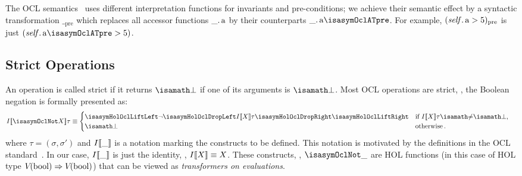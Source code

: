 The OCL semantics~\cite[Annex A]{omg:ocl:2003} uses different interpretation
functions for invariants and pre-conditions; we achieve their semantic effect by
a syntactic transformation $\__\text{pre}$ which replaces all accessor functions
$\getAttrib{\_}{a}$ by their counterparts
$\getAttrib{\_}{a\isasymOclATpre}$. For example, $(\getAttrib{\self}{a} >
5)_\text{pre}$ is just $(\getAttrib{\self}{a\isasymOclATpre} > 5)$.

\subsection{Strict Operations}%
\label{sec:strict-ops}%
An operation is called strict if it returns $\isasymbottom$ if one of its
arguments is $\isasymbottom$. Most {OCL} operations are strict, \eg, the
Boolean negation is formally presented as:
\begin{align*}
I\semantics{\isasymOclNot X}\tau & \equiv
  \begin{cases}
    \lift{\lnot \drop{I\semantics{X} \tau}}
    &\text{if $I\semantics{X}\tau\isasymnoteq\isasymbottom$}, \\
     \isasymbottom & \text{otherwise}\,.
   \end{cases}
\end{align*}
where $\tau = (\sigma, \sigma')$ and $I\llbracket \_ \rrbracket$ is a notation marking the
\holocl constructs to be defined. This notation is motivated by the definitions
in the {OCL} standard~\cite{omg:ocl:2003}. In our case, $I\llbracket \_ \rrbracket$ is
just the identity, \ie, $I\llbracket X \rrbracket\equiv X$.  These constructs, \ie,
$\isasymOclNot \_$ are HOL functions (in this case of HOL type
$V_{}({\mathrm{bool}}) \Rightarrow V_{}({\mathrm{bool}})$) that can be viewed as
\emph{transformers on evaluations}.

